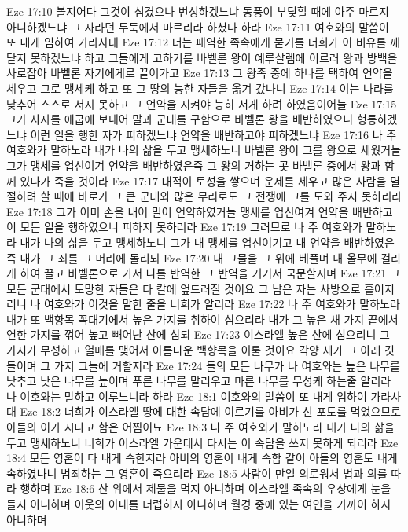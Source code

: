 Eze 17:10  볼지어다 그것이 심겼으나 번성하겠느냐 동풍이 부딪힐 때에 아주 마르지 아니하겠느냐 그 자라던 두둑에서 마르리라 하셨다 하라
Eze 17:11  여호와의 말씀이 또 내게 임하여 가라사대
Eze 17:12  너는 패역한 족속에게 묻기를 너희가 이 비유를 깨닫지 못하겠느냐 하고 그들에게 고하기를 바벨론 왕이 예루살렘에 이르러 왕과 방백을 사로잡아 바벨론 자기에게로 끌어가고
Eze 17:13  그 왕족 중에 하나를 택하여 언약을 세우고 그로 맹세케 하고 또 그 땅의 능한 자들을 옮겨 갔나니
Eze 17:14  이는 나라를 낮추어 스스로 서지 못하고 그 언약을 지켜야 능히 서게 하려 하였음이어늘
Eze 17:15  그가 사자를 애굽에 보내어 말과 군대를 구함으로 바벨론 왕을 배반하였으니 형통하겠느냐 이런 일을 행한 자가 피하겠느냐 언약을 배반하고야 피하겠느냐
Eze 17:16  나 주 여호와가 말하노라 내가 나의 삶을 두고 맹세하노니 바벨론 왕이 그를 왕으로 세웠거늘 그가 맹세를 업신여겨 언약을 배반하였은즉 그 왕의 거하는 곳 바벨론 중에서 왕과 함께 있다가 죽을 것이라
Eze 17:17  대적이 토성을 쌓으며 운제를 세우고 많은 사람을 멸절하려 할 때에 바로가 그 큰 군대와 많은 무리로도 그 전쟁에 그를 도와 주지 못하리라
Eze 17:18  그가 이미 손을 내어 밀어 언약하였거늘 맹세를 업신여겨 언약을 배반하고 이 모든 일을 행하였으니 피하지 못하리라
Eze 17:19  그러므로 나 주 여호와가 말하노라 내가 나의 삶을 두고 맹세하노니 그가 내 맹세를 업신여기고 내 언약을 배반하였은즉 내가 그 죄를 그 머리에 돌리되
Eze 17:20  내 그물을 그 위에 베풀며 내 올무에 걸리게 하여 끌고 바벨론으로 가서 나를 반역한 그 반역을 거기서 국문할지며
Eze 17:21  그 모든 군대에서 도망한 자들은 다 칼에 엎드러질 것이요 그 남은 자는 사방으로 흩어지리니 나 여호와가 이것을 말한 줄을 너희가 알리라
Eze 17:22  나 주 여호와가 말하노라 내가 또 백향목 꼭대기에서 높은 가지를 취하여 심으리라 내가 그 높은 새 가지 끝에서 연한 가지를 꺾어 높고 빼어난 산에 심되
Eze 17:23  이스라엘 높은 산에 심으리니 그 가지가 무성하고 열매를 맺어서 아름다운 백향목을 이룰 것이요 각양 새가 그 아래 깃들이며 그 가지 그늘에 거할지라
Eze 17:24  들의 모든 나무가 나 여호와는 높은 나무를 낮추고 낮은 나무를 높이며 푸른 나무를 말리우고 마른 나무를 무성케 하는줄 알리라 나 여호와는 말하고 이루느니라 하라
Eze 18:1  여호와의 말씀이 또 내게 임하여 가라사대
Eze 18:2  너희가 이스라엘 땅에 대한 속담에 이르기를 아비가 신 포도를 먹었으므로 아들의 이가 시다고 함은 어찜이뇨
Eze 18:3  나 주 여호와가 말하노라 내가 나의 삶을 두고 맹세하노니 너희가 이스라엘 가운데서 다시는 이 속담을 쓰지 못하게 되리라
Eze 18:4  모든 영혼이 다 내게 속한지라 아비의 영혼이 내게 속함 같이 아들의 영혼도 내게 속하였나니 범죄하는 그 영혼이 죽으리라
Eze 18:5  사람이 만일 의로워서 법과 의를 따라 행하며
Eze 18:6  산 위에서 제물을 먹지 아니하며 이스라엘 족속의 우상에게 눈을 들지 아니하며 이웃의 아내를 더럽히지 아니하며 월경 중에 있는 여인을 가까이 하지 아니하며

